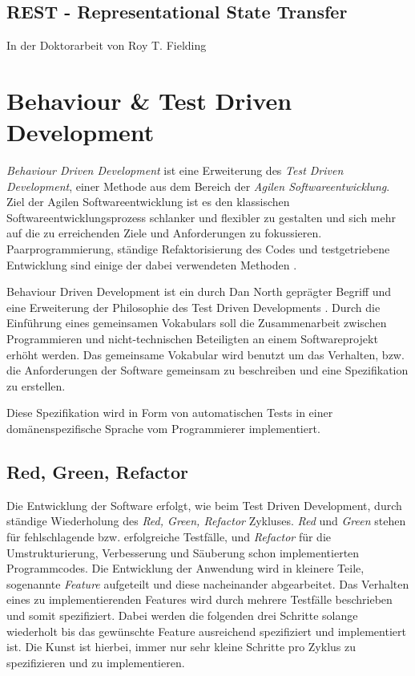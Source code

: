 \subsection{REST - Representational State Transfer}
\label{rest}

In der Doktorarbeit von Roy T. Fielding \cite{Fielding2000}
\cite{Richardson07}

\section{Behaviour \& Test Driven Development}

\textit{Behaviour Driven Development} ist eine Erweiterung des
\textit{Test Driven Development}, einer Methode aus dem Bereich der
\textit{Agilen Softwareentwicklung}. Ziel der Agilen
Softwareentwicklung ist es den klassischen Softwareentwicklungsprozess
schlanker und flexibler zu gestalten und sich mehr auf die zu
erreichenden Ziele und Anforderungen zu
fokussieren. Paarprogrammierung, ständige Refaktorisierung des Codes
und testgetriebene Entwicklung sind einige der dabei verwendeten
Methoden \cite{wiki:agile}.

Behaviour Driven Development ist ein durch Dan North geprägter Begriff
und eine Erweiterung der Philosophie des Test Driven Developments
\cite{wiki:bdd}. Durch die Einführung eines gemeinsamen Vokabulars
soll die Zusammenarbeit zwischen Programmieren und nicht-technischen
Beteiligten an einem Softwareprojekt erhöht werden. Das gemeinsame
Vokabular wird benutzt um das Verhalten, bzw. die Anforderungen der
Software gemeinsam zu beschreiben und eine Spezifikation zu erstellen.

Diese Spezifikation wird in Form von automatischen Tests in einer
domänen\-spezifische Sprache vom Programmierer implementiert.

\subsection{Red, Green, Refactor}

Die Entwicklung der Software erfolgt, wie beim Test Driven
Development, durch ständige Wiederholung des \textit{Red, Green,
  Refactor} Zykluses. \textit{Red} und \textit{Green} stehen für
fehlschlagende bzw. erfolgreiche Testfälle, und \textit{Refactor} für
die Umstrukturierung, Verbesserung und Säuberung schon implementierten
Programmcodes. Die Entwicklung der Anwendung wird in kleinere Teile,
sogenannte \textit{Feature} aufgeteilt und diese nacheinander
abgearbeitet. Das Verhalten eines zu implementierenden Features wird
durch mehrere Testfälle beschrieben und somit spezifiziert. Dabei
werden die folgenden drei Schritte solange wiederholt bis das
gewünschte Feature ausreichend spezifiziert und implementiert ist. Die
Kunst ist hierbei, immer nur sehr kleine Schritte pro Zyklus zu
spezifizieren und zu implementieren.

